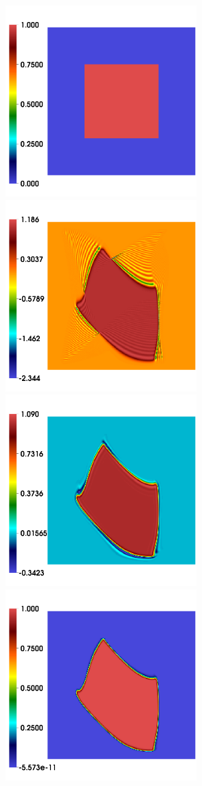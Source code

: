 \documentclass[final]{siamltex}
\begin{document}
\begin{figure}
\begin{center}
\includegraphics[width=2.9in]{square_init}\\
\includegraphics[width=2.9in]{square_cen}
\includegraphics[width=2.9in]{square_unl_b_bds}\\
\includegraphics[width=2.9in]{square_lim_b_bds}

\end{center}
\end{figure}
\end{document}

